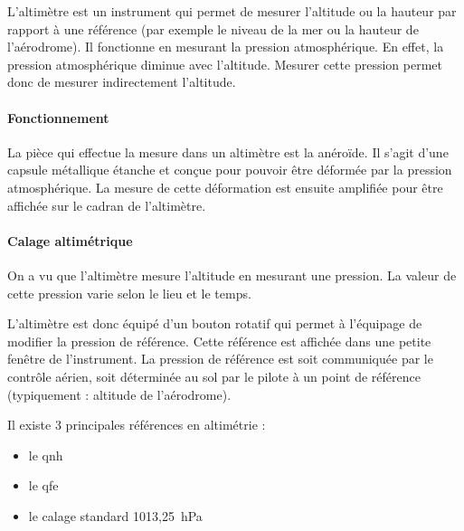 	L'\gls{altimètre}  est un instrument qui permet de mesurer l'altitude ou la hauteur par rapport à une référence (par exemple le niveau de la mer ou la hauteur de l'aérodrome). Il fonctionne en mesurant la pression atmosphérique. En effet, la pression atmosphérique diminue avec l'altitude. Mesurer cette pression permet donc de mesurer indirectement l'altitude. \\
	
	\begin{figure}[H]	
	\centering
	\end{figure}
	
	\paragraph{Fonctionnement} La pièce qui effectue la mesure dans un altimètre est la \gls{anéroïde}. Il s'agit d'une capsule métallique étanche et conçue pour pouvoir être déformée par la pression atmosphérique. La mesure de cette déformation est ensuite amplifiée pour être affichée sur le cadran de l'altimètre.
	
	\paragraph{Calage altimétrique}
	On a vu que l'altimètre mesure l'altitude en mesurant une pression. La valeur de cette pression varie selon le lieu et le temps. 
	
	L'altimètre est donc équipé d'un bouton rotatif qui permet à l'équipage de modifier la pression de référence. Cette référence est affichée dans une petite fenêtre de l'instrument. La pression de référence est soit communiquée par le contrôle aérien, soit déterminée au sol par le pilote à un point de référence (typiquement : altitude de l'aérodrome).
	
	
	Il existe 3 principales références en altimétrie :
	\begin{itemize}
		\item le \acrshort{qnh}
		\item le \acrshort{qfe}
		\item le calage standard 1013,25~hPa
	\end{itemize}
	
